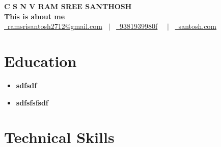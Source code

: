 \documentclass[letterpaper,5pt]{article}
\begin{document}
    
    \begin{center}
      \textbf{\Huge \scshape C S N V RAM SREE SANTHOSH} \\ \vspace{5pt}
      \textbf{\large This is about me} \\ \vspace{2pt}
      \href{mailto:ramsrisantosh2712@gmail.com}{\raisebox{-0.05\height}\faEnvelope \ ramsrisantosh2712@gmail.com} 
      \ $|$ \ \href{tel:9381939980f}{\raisebox{-0.05\height}\faMobile \ 9381939980f}  \
      \ $|$ \ \href{santosh.com}{\raisebox{-0.05\height}\faGlobe \ santosh.com}  \
       \
    \end{center}
    
      
    
    \section{Education}
      
      
        \begin{itemize}[leftmargin=0.15in, label={}]
        \item[]
          \textbf{ sdfsdf } \hfill  \\
          \textit{    } \hfill  
        \end{itemize}
        \vspace{-15pt}
      
        \begin{itemize}[leftmargin=0.15in, label={}]
        \item[]
          \textbf{ sdfsfsfsdf } \hfill  \\
          \textit{    } \hfill  
        \end{itemize}
        \vspace{-15pt}
      
      \vspace{10mm}
    
    \vspace*{-10.5mm}  

    
    \section{Technical Skills}
    
\end{document}
